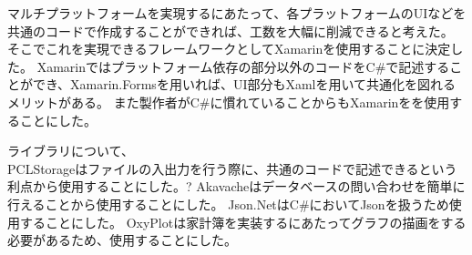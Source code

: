 ﻿\documentclass{jsarticle}
\begin{document}
       	マルチプラットフォームを実現するにあたって、各プラットフォームのUIなどを共通のコードで作成することができれば、工数を大幅に削減できると考えた。
        そこでこれを実現できるフレームワークとしてXamarinを使用することに決定した。
        Xamarinではプラットフォーム依存の部分以外のコードをC\#で記述することができ、Xamarin.Formsを用いれば、UI部分もXamlを用いて共通化を図れるメリットがある。
        また製作者がC\#に慣れていることからもXamarinをを使用することにした。
        
        ライブラリについて、\\
        PCLStorageはファイルの入出力を行う際に、共通のコードで記述できるという利点から使用することにした。?
        Akavacheはデータベースの問い合わせを簡単に行えることから使用することにした。
        Json.NetはC\#においてJsonを扱うため使用することにした。
        OxyPlotは家計簿を実装するにあたってグラフの描画をする必要があるため、使用することにした。
    
\end{document}
